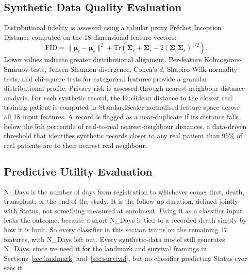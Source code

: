 \documentclass[journal]{IEEEtran}
\begin{document}
\subsection{Synthetic Data Quality Evaluation}

Distributional fidelity is assessed using a tabular proxy Fr\'{e}chet Inception Distance computed on the 18-dimensional feature vectors:
\begin{equation}
\text{FID} = \|\boldsymbol{\mu}_r - \boldsymbol{\mu}_s\|^2 + \text{Tr}\!\left(\boldsymbol{\Sigma}_r + \boldsymbol{\Sigma}_s - 2(\boldsymbol{\Sigma}_r \boldsymbol{\Sigma}_s)^{1/2}\right).
\end{equation}
Lower values indicate greater distributional alignment. Per-feature Kolmogorov-Smirnov tests, Jensen-Shannon divergence, Cohen's $d$, Shapiro-Wilk normality tests, and chi-square tests for categorical features provide a granular distributional profile. Privacy risk is assessed through nearest-neighbour distance analysis. For each synthetic record, the Euclidean distance to the closest real training patient is computed in StandardScaler-normalised feature space across all 18 input features. A record is flagged as a near-duplicate if its distance falls below the 5th percentile of real-to-real nearest-neighbour distances, a data-driven threshold that identifies synthetic records closer to any real patient than 95\% of real patients are to their nearest real neighbour.

\subsection{Predictive Utility Evaluation}
\label{sec:predutil}

N\_Days is the number of days from registration to whichever comes first, death, transplant, or the end of the study. It is the follow-up duration, defined jointly with Status, not something measured at enrolment. Using it as a classifier input leaks the outcome, because a short N\_Days is tied to a recorded death simply by how it is built. So every classifier in this section trains on the remaining 17 features, with N\_Days left out. Every synthetic-data model still generates N\_Days, since we need it for the landmark and survival framings in Sections~\ref{sec:landmark} and~\ref{sec:survival}, but no classifier predicting Status ever sees it.
\end{document}
